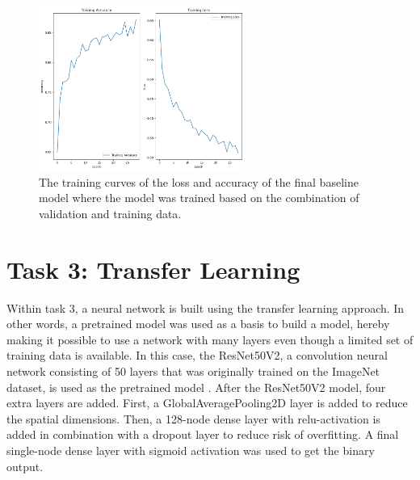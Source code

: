 \documentclass[conference]{IEEEtran}
\begin{document}
\begin{figure}[p] \centering \includegraphics[width=0.6\textwidth]{fig_task2_training_curves_train_final_model.png}
	\caption{The training curves of the loss and accuracy of the final baseline model where the model was trained based on the combination of validation and training data.} 	
	\label{fig:task2_curves_final} 
\end{figure}

\section{Task 3: Transfer Learning}\label{sec:task_3}


Within task 3, a neural network is built using the transfer learning approach. In other words, a pretrained model was used as a basis to build a model, hereby making it possible to use a network with many layers even though a limited set of training data is available. 
In this case, the ResNet50V2, a convolution neural network consisting of 50 layers that was originally trained on the ImageNet dataset, is used as the pretrained model \cite{resnet}. After the ResNet50V2 model, four extra layers are added. First, a GlobalAveragePooling2D layer is added to reduce the spatial dimensions. Then, a 128-node dense layer with relu-activation is added in combination with a dropout layer to reduce risk of overfitting. A final single-node dense layer with sigmoid activation was used to get the binary output.
\end{document}
